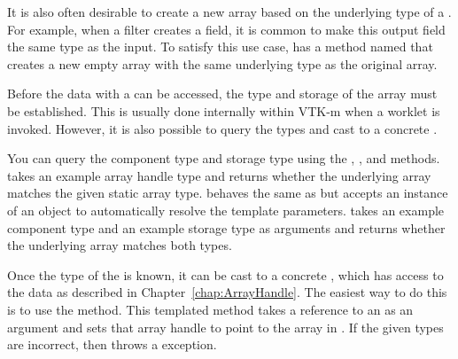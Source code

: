 It is also often desirable to create a new array based on the underlying
type of a . For example, when a filter
creates a field, it is common to make this output field the same type as
the input. To satisfy this use case, 
has a method named  that creates a new empty array
with the same underlying type as the original array.


Before the data with a  can be accessed,
the type and storage of the array must be established. This is usually done
internally within VTK-m when a worklet  is invoked.
However, it is also possible to query the types and cast to a concrete
.

You can query the component type and storage type using the
, , and
 methods.  takes an
example array handle type and returns whether the underlying array matches
the given static array type.  behaves the same as
 but accepts an instance of an
 object to automatically resolve the template
parameters.  takes an example
component type and an example storage type as arguments and returns whether
the underlying array matches both types.


Once the type of the  is known, it can
be cast to a concrete , which has access to the
data as described in Chapter~\ref{chap:ArrayHandle}. The easiest way to do
this is to use the  method. This templated method takes a
reference to an  as an argument and sets that
array handle to point to the array in .
If the given types are incorrect, then  throws
a  exception.


